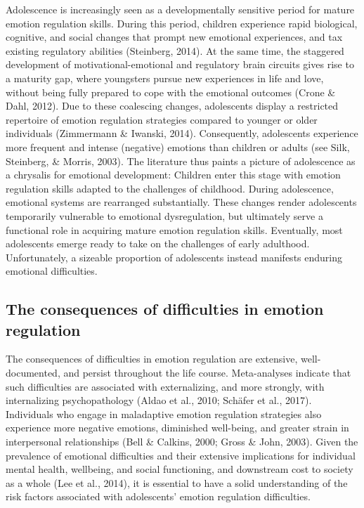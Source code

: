 \documentclass[
  english,
  man]{apa6}
\begin{document}
Adolescence is increasingly seen as a developmentally sensitive period for
mature emotion regulation skills. During this period, children experience rapid
biological, cognitive, and social changes that prompt new emotional
experiences, and tax existing regulatory abilities
(Steinberg, 2014). At the same time, the staggered
development of motivational-emotional and regulatory brain circuits gives rise
to a maturity gap, where youngsters pursue new experiences in life and love,
without being fully prepared to cope with the emotional outcomes
(Crone \& Dahl, 2012). Due to these coalescing changes,
adolescents display a restricted repertoire of emotion regulation strategies
compared to younger or older individuals
(Zimmermann \& Iwanski, 2014). Consequently, adolescents experience
more frequent and intense (negative) emotions than children or adults (see Silk, Steinberg, \& Morris, 2003). The literature thus paints a picture of
adolescence as a chrysalis for emotional development: Children enter this stage
with emotion regulation skills adapted to the challenges of childhood. During
adolescence, emotional systems are rearranged substantially. These changes
render adolescents temporarily vulnerable to emotional dysregulation, but
ultimately serve a functional role in acquiring mature emotion regulation
skills. Eventually, most adolescents emerge ready to take on the challenges of
early adulthood. Unfortunately, a sizeable proportion of adolescents instead
manifests enduring emotional difficulties.

\hypertarget{the-consequences-of-difficulties-in-emotion-regulation}{%
\subsection{The consequences of difficulties in emotion regulation}\label{the-consequences-of-difficulties-in-emotion-regulation}}

The
consequences of difficulties in emotion regulation are extensive,
well-documented, and persist throughout the life course. Meta-analyses indicate
that such difficulties are associated with externalizing, and more strongly,
with internalizing psychopathology
(Aldao et al., 2010; Schäfer et al., 2017). Individuals who engage in maladaptive
emotion regulation strategies also experience more negative emotions,
diminished well-being, and greater strain in interpersonal relationships
(Bell \& Calkins, 2000; Gross \& John, 2003).
Given the
prevalence of emotional difficulties and their extensive implications for
individual mental health, wellbeing, and social functioning, and downstream
cost to society as a whole (Lee et al., 2014), it is essential to
have a solid understanding of the risk factors associated with adolescents'
emotion regulation difficulties.
\end{document}
